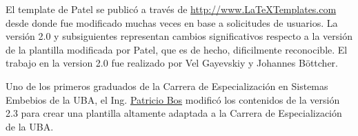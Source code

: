 El template de Patel se publicó a través de  \url{http://www.LaTeXTemplates.com} desde donde fue modificado muchas veces en base a solicitudes de usuarios. La versión 2.0 y subsiguientes representan cambios significativos respecto a la versión de la plantilla modificada por Patel, que es de hecho, dificilmente reconocible. El trabajo en la version 2.0 fue realizado por Vel Gayevskiy y Johannes Böttcher.

Uno de los primeros graduados de la Carrera de Especialización en Sistemas Embebios de la UBA, el Ing. \href{mailto:pbos@fi.uba.ar}{Patricio Bos} modificó los contenidos de la versión 2.3 para crear una plantilla altamente adaptada a la Carrera de Especialización de la UBA.







